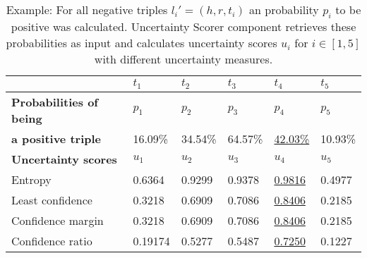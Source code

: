 \begin{table}[H]
    \centering
    \begin{tabular}{llllll}
        \toprule
        
        &  \textbf{$t_1$} & \textbf{$t_2$} & \textbf{$t_3$} & \textbf{$t_4$} & \textbf{$t_5$} \\
         
        \midrule
        
        \textbf{Probabilities of being}
         & $p_1$ & $p_2$ & $p_3$ & $p_4$ & $p_5$   \\
         
        \textbf{a positive triple}
        & 16.09\% 
        & 34.54\% 
        & 64.57\%
        & \underline{42.03\%} 
        & 10.93\%  \\
        
        \midrule
        \textbf{Uncertainty scores}
        & $u_1$ & $u_2$ & $u_3$ & $u_4$ & $u_5$ \\
        
        Entropy 
        & 0.6364 & 0.9299 & 0.9378 & \underline{0.9816} & 0.4977 \\
        
        Least confidence 
        & 0.3218 & 0.6909 & 0.7086 & \underline{0.8406} & 0.2185 \\
        
        Confidence margin
        & 0.3218 & 0.6909 & 0.7086 & \underline{0.8406} & 0.2185 \\
        
        Confidence ratio
        & 0.19174 & 0.5277 & 0.5487 & \underline{0.7250} & 0.1227\\
        
        \bottomrule
    \end{tabular}
    \caption{Example: For all negative triples $l_i' = (h, r, t_i)$ an probability $p_i$ to be positive was calculated. Uncertainty Scorer component retrieves these probabilities as input and calculates uncertainty scores $u_i$ for $i \in [1, 5]$ with different uncertainty measures.}
\label{tab:uncertainty_scores}
\end{table}